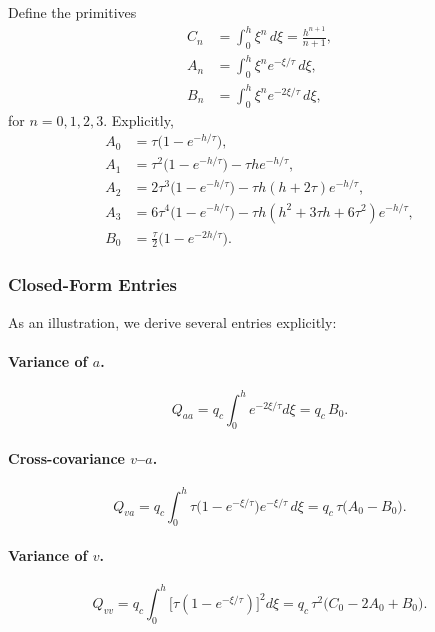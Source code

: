 \documentclass[10pt]{extarticle}
\begin{document}
Define the primitives
\begin{align}
C_n &= \int_0^h \xi^n \, d\xi = \frac{h^{n+1}}{n+1}, \\
A_n &= \int_0^h \xi^n e^{-\xi/\tau} \, d\xi, \\
B_n &= \int_0^h \xi^n e^{-2\xi/\tau} \, d\xi,
\end{align}
for $n=0,1,2,3$. Explicitly,
\begin{align}
A_0 &= \tau \bigl(1 - e^{-h/\tau}\bigr), \\
A_1 &= \tau^2 \bigl(1 - e^{-h/\tau}\bigr) - \tau h e^{-h/\tau}, \\
A_2 &= 2\tau^3 \bigl(1 - e^{-h/\tau}\bigr) - \tau h(h+2\tau) e^{-h/\tau}, \\
A_3 &= 6\tau^4 \bigl(1 - e^{-h/\tau}\bigr) - \tau h(h^2 + 3\tau h + 6\tau^2) e^{-h/\tau}, \\
B_0 &= \tfrac{\tau}{2} \bigl(1 - e^{-2h/\tau}\bigr).
\end{align}

\subsubsection{Closed-Form Entries}

As an illustration, we derive several entries explicitly:

\paragraph{Variance of $a$.}
\begin{equation}
Q_{aa} = q_c \int_0^h e^{-2\xi/\tau} d\xi = q_c \, B_0.
\end{equation}

\paragraph{Cross-covariance $v$--$a$.}
\begin{equation}
Q_{va} = q_c \int_0^h \tau\bigl(1 - e^{-\xi/\tau}\bigr) e^{-\xi/\tau}\, d\xi
= q_c \,\tau \bigl(A_0 - B_0\bigr).
\end{equation}

\paragraph{Variance of $v$.}
\begin{equation}
Q_{vv} = q_c \int_0^h \bigl[\tau(1 - e^{-\xi/\tau})\bigr]^2 d\xi
= q_c\, \tau^2 \bigl(C_0 - 2A_0 + B_0\bigr).
\end{equation}
\end{document}
